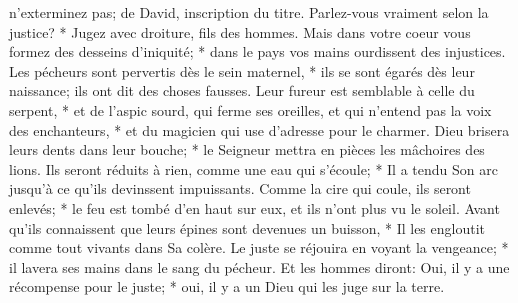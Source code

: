n'exterminez pas; de David, inscription du titre.
Parlez-vous vraiment selon la justice? * Jugez avec droiture, fils des hommes.
Mais dans votre coeur vous formez des desseins d'iniquité; * dans le pays vos mains ourdissent des injustices.
Les pécheurs sont pervertis dès le sein maternel, * ils se sont égarés dès leur naissance; ils ont dit des choses fausses.
Leur fureur est semblable à celle du serpent, * et de l'aspic sourd, qui ferme ses oreilles,
et qui n'entend pas la voix des enchanteurs, * et du magicien qui use d'adresse pour le charmer.
Dieu brisera leurs dents dans leur bouche; * le Seigneur mettra en pièces les mâchoires des lions.
Ils seront réduits à rien, comme une eau qui s'écoule; * Il a tendu Son arc jusqu'à ce qu'ils devinssent impuissants.
Comme la cire qui coule, ils seront enlevés; * le feu est tombé d'en haut sur eux, et ils n'ont plus vu le soleil.
Avant qu'ils connaissent que leurs épines sont devenues un buisson, * Il les engloutit comme tout vivants dans Sa colère.
Le juste se réjouira en voyant la vengeance; * il lavera ses mains dans le sang du pécheur.
Et les hommes diront: Oui, il y a une récompense pour le juste; * oui, il y a un Dieu qui les juge sur la terre.


